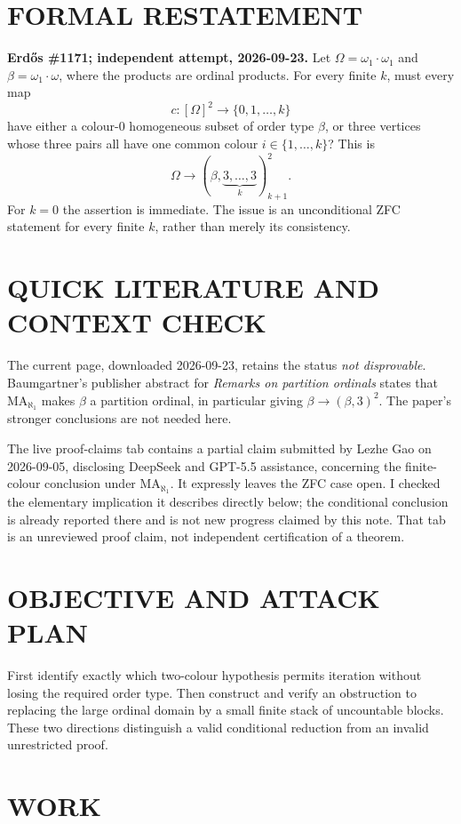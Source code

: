 \section{FORMAL RESTATEMENT}
\textbf{Erd\H{o}s \#1171; independent attempt, 2026-09-23.}
Let $\Omega=\omega_1\cdot\omega_1$ and $\beta=\omega_1\cdot\omega$, where the products are ordinal products. For every finite $k$, must every map
\[
c:[\Omega]^2\longrightarrow\{0,1,\ldots,k\}
\]
have either a colour-$0$ homogeneous subset of order type $\beta$, or three vertices whose three pairs all have one common colour $i\in\{1,\ldots,k\}$? This is
\[
\Omega\longrightarrow(\beta,\underbrace{3,\ldots,3}_{k})^2_{k+1}.
\]
For $k=0$ the assertion is immediate. The issue is an unconditional ZFC statement for every finite $k$, rather than merely its consistency.

\section{QUICK LITERATURE AND CONTEXT CHECK}
The current page, downloaded 2026-09-23, retains the status \emph{not disprovable}. Baumgartner's publisher abstract for \emph{Remarks on partition ordinals} states that $\mathrm{MA}_{\aleph_1}$ makes $\beta$ a partition ordinal, in particular giving $\beta\to(\beta,3)^2$. The paper's stronger conclusions are not needed here.

The live proof-claims tab contains a partial claim submitted by Lezhe Gao on 2026-09-05, disclosing DeepSeek and GPT-5.5 assistance, concerning the finite-colour conclusion under $\mathrm{MA}_{\aleph_1}$. It expressly leaves the ZFC case open. I checked the elementary implication it describes directly below; the conditional conclusion is already reported there and is not new progress claimed by this note. That tab is an unreviewed proof claim, not independent certification of a theorem.

\section{OBJECTIVE AND ATTACK PLAN}
First identify exactly which two-colour hypothesis permits iteration without losing the required order type. Then construct and verify an obstruction to replacing the large ordinal domain by a small finite stack of uncountable blocks. These two directions distinguish a valid conditional reduction from an invalid unrestricted proof.

\section{WORK}
